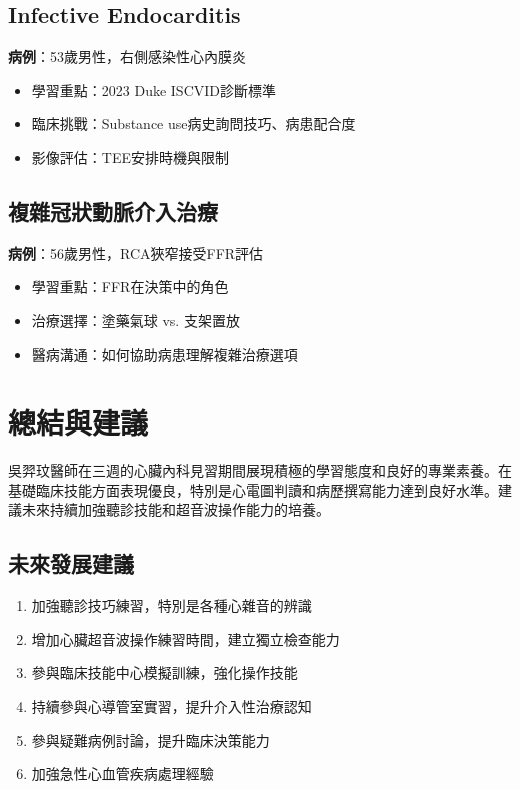 \documentclass[12pt,a4paper]{article}
\begin{document}
\subsection{Infective Endocarditis}

\textbf{病例}：53歲男性，右側感染性心內膜炎
\begin{itemize}
\item 學習重點：2023 Duke ISCVID診斷標準
\item 臨床挑戰：Substance use病史詢問技巧、病患配合度
\item 影像評估：TEE安排時機與限制
\end{itemize}

\subsection{複雜冠狀動脈介入治療}

\textbf{病例}：56歲男性，RCA狹窄接受FFR評估
\begin{itemize}
\item 學習重點：FFR在決策中的角色
\item 治療選擇：塗藥氣球 vs. 支架置放
\item 醫病溝通：如何協助病患理解複雜治療選項
\end{itemize}

\section{總結與建議}

吳羿玟醫師在三週的心臟內科見習期間展現積極的學習態度和良好的專業素養。在基礎臨床技能方面表現優良，特別是心電圖判讀和病歷撰寫能力達到良好水準。建議未來持續加強聽診技能和超音波操作能力的培養。

\subsection{未來發展建議}
\begin{enumerate}
\item 加強聽診技巧練習，特別是各種心雜音的辨識
\item 增加心臟超音波操作練習時間，建立獨立檢查能力
\item 參與臨床技能中心模擬訓練，強化操作技能
\item 持續參與心導管室實習，提升介入性治療認知
\item 參與疑難病例討論，提升臨床決策能力
\item 加強急性心血管疾病處理經驗
\end{enumerate}
\end{document}
